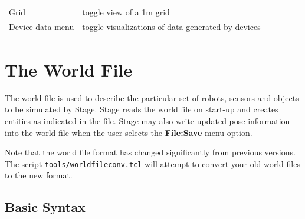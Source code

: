 \documentclass[11pt]{report}
\begin{document}
\begin{tabular}{|l|l|}
\hline 
Grid & toggle view of a 1m grid\\
Device data menu & toggle visualizations of data generated by devices\\
\hline
\end{tabular}


\chapter{The World File}
\label{sec:world}

The world file is used to describe the particular set of robots,
sensors and objects to be simulated by Stage.  Stage reads the world
file on start-up and creates entities as indicated in the file.  Stage
may also write updated pose information into the world file when the
user selects the {\bf File:Save} menu option.

Note that the world file format has changed significantly from
previous versions. The script \verb+tools/worldfileconv.tcl+ will
attempt to convert your old world files to the new format.

\section{Basic Syntax}
\end{document}
